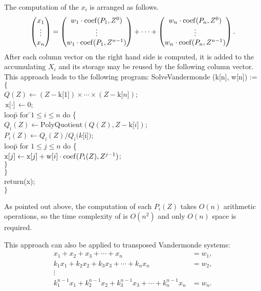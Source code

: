 The computation of the $x_i$ is arranged as follows.
\[
\begin{pmatrix}x_1\\ \vdots\\ x_n\end{pmatrix} =
\begin{pmatrix}w_1 \cdot \operatorname{coef}(P_1, Z^0) \\  \vdots \\ w_1 \cdot \operatorname{coef}(P_1, Z^{n-1}) \end{pmatrix}
+ \cdots +
\begin{pmatrix}w_n \cdot \operatorname{coef}(P_n, Z^0) \\  \vdots \\ 
         w_n \cdot \operatorname{coef}(P_n, Z^{n-1}) \end{pmatrix}.
\]
After each column vector on the right hand side is computed, it is 
added to the accumulating $X_i$ and its storage may be reused by 
the following column vector.  This approach leads to the following
program:
\begindsacode
SolveVandermonde (k[n], w[n]) := $\{$ \\
\> $Q(Z) \leftarrow   (Z - \mbox{k[$1$]})\times \cdots \times (Z - \mbox{k[$n$]})$; \\
\> $\mbox{x[$\cdot$]} \leftarrow 0$; \\
\> loo\=p for \=$1 \le i \le n$ do \{ \\
\>\> $Q_i(Z) \leftarrow \mbox{PolyQuotient}(Q(Z), Z - \mbox{k[$i$]})$; \\
\>\> $P_i(Z) \leftarrow Q_i(Z)/Q_i(k[$i$])$; \\
\>\> loo\=p for $1 \le j \le n$ do \{ \\
\>\>\> $\mbox{x[$j$]} \leftarrow \mbox{x[$j$]} + \mbox{w[$i$]} \cdot
\operatorname{coef}(P_i(Z), Z^{j-1})$;\\
\>\>\> $\}$ \\
\>\> $\}$ \\
\> return(x); \\
\> $\}$
\enddsacode

As pointed out above, the computation of each $P_i(Z)$ takes $O(n)$
arithmetic operations, so the time complexity of
 is $O(n^2)$ and only $O(n)$ space is
required.

\medskip
This approach can also be applied to transposed Vandermonde
systems:
\begin{equation}\label{Trans:Vander:Eq}
\begin{aligned}
x_1 + x_2 + x_3 + \cdots + x_n & = w_1,\\
k_1 x_1 + k_2 x_2 + k_3 x_3 + \cdots + k_n x_n & = w_2,\\
\vdots\\
k_1^{n-1} x_1 + k_2^{n-1} x_2 + k_3^{n-1} x_3 +
 \cdots + k_n^{n-1} x_n & = w_n.
\end{aligned}
\end{equation}

